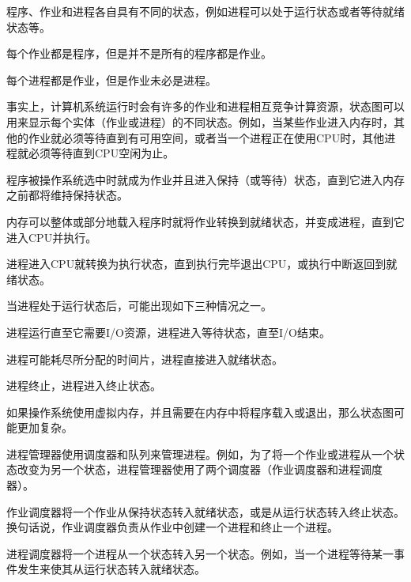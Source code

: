程序、作业和进程各自具有不同的状态，例如进程可以处于运行状态或者等待就绪状态等。

\begin{compactitem}
\item 每个作业都是程序，但是并不是所有的程序都是作业。
\item 每个进程都是作业，但是作业未必是进程。
\end{compactitem}

事实上，计算机系统运行时会有许多的作业和进程相互竞争计算资源，状态图可以用来显示每个实体（作业或进程）的不同状态。例如，当某些作业进入内存时，其他的作业就必须等待直到有可用空间，或者当一个进程正在使用CPU时，其他进程就必须等待直到CPU空闲为止。


\begin{compactitem}
\item 程序被操作系统选中时就成为作业并且进入保持（或等待）状态，直到它进入内存之前都将维持保持状态。
\item 内存可以整体或部分地载入程序时就将作业转换到就绪状态，并变成进程，直到它进入CPU并执行。
\item 进程进入CPU就转换为执行状态，直到执行完毕退出CPU，或执行中断返回到就绪状态。
\end{compactitem}

当进程处于运行状态后，可能出现如下三种情况之一。

\begin{compactitem}
\item 进程运行直至它需要I/O资源，进程进入等待状态，直至I/O结束。
\item 进程可能耗尽所分配的时间片，进程直接进入就绪状态。
\item 进程终止，进程进入终止状态。
\end{compactitem}

如果操作系统使用虚拟内存，并且需要在内存中将程序载入或退出，那么状态图可能更加复杂。

进程管理器使用调度器和队列来管理进程。例如，为了将一个作业或进程从一个状态改变为另一个状态，进程管理器使用了两个调度器（作业调度器和进程调度器）。


\begin{compactitem}
\item 作业调度器将一个作业从保持状态转入就绪状态，或是从运行状态转入终止状态。换句话说，作业调度器负责从作业中创建一个进程和终止一个进程。
\item 进程调度器将一个进程从一个状态转入另一个状态。例如，当一个进程等待某一事件发生来使其从运行状态转入就绪状态。
\end{compactitem}


